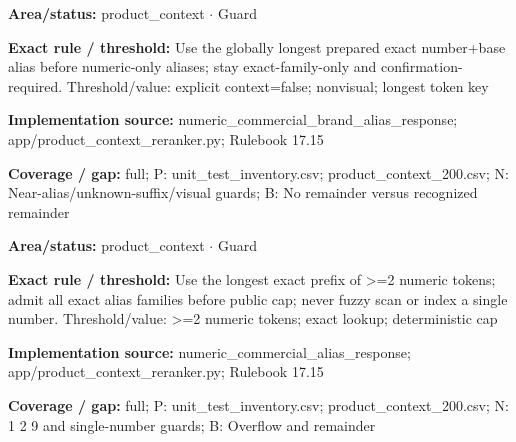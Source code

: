 \begin{tcolorbox}[enhanced,breakable,colback=white,colframe=Muted!45,boxrule=0.45pt,arc=1.5pt,left=6pt,right=6pt,top=5pt,bottom=5pt,title={\texttt{PC-NUMERIC-BRAND-ALIAS-21}},title after break={\texttt{PC-NUMERIC-BRAND-ALIAS-21}\ (continued)},fonttitle=\headingfont\bfseries\color{Navy},coltitle=Navy]
\textbf{Area/status:} product\_\allowbreak{}context $\boldsymbol{\cdot}$ Guard\par
\smallskip
\textbf{Exact rule / threshold:} Use the globally longest prepared exact number+base alias before numeric-only aliases; stay exact-family-only and confirmation-required. Threshold/\allowbreak{}value: explicit context=false; nonvisual; longest token key\par
\smallskip
\textbf{Implementation source:} numeric\_\allowbreak{}commercial\_\allowbreak{}brand\_\allowbreak{}alias\_\allowbreak{}response; app/\allowbreak{}product\_\allowbreak{}context\_\allowbreak{}reranker.py; Rulebook 17.15\par
\smallskip
\textbf{Coverage / gap:} full; P: unit\_\allowbreak{}test\_\allowbreak{}inventory.csv; product\_\allowbreak{}context\_\allowbreak{}200.csv; N: Near-alias/\allowbreak{}unknown-suffix/\allowbreak{}visual guards; B: No remainder versus recognized remainder
\end{tcolorbox}
\begin{tcolorbox}[enhanced,breakable,colback=white,colframe=Muted!45,boxrule=0.45pt,arc=1.5pt,left=6pt,right=6pt,top=5pt,bottom=5pt,title={\texttt{PC-NUMERIC-ONLY-ALIAS-22}},title after break={\texttt{PC-NUMERIC-ONLY-ALIAS-22}\ (continued)},fonttitle=\headingfont\bfseries\color{Navy},coltitle=Navy]
\textbf{Area/status:} product\_\allowbreak{}context $\boldsymbol{\cdot}$ Guard\par
\smallskip
\textbf{Exact rule / threshold:} Use the longest exact prefix of >=2 numeric tokens; admit all exact alias families before public cap; never fuzzy scan or index a single number. Threshold/\allowbreak{}value: >=2 numeric tokens; exact lookup; deterministic cap\par
\smallskip
\textbf{Implementation source:} numeric\_\allowbreak{}commercial\_\allowbreak{}alias\_\allowbreak{}response; app/\allowbreak{}product\_\allowbreak{}context\_\allowbreak{}reranker.py; Rulebook 17.15\par
\smallskip
\textbf{Coverage / gap:} full; P: unit\_\allowbreak{}test\_\allowbreak{}inventory.csv; product\_\allowbreak{}context\_\allowbreak{}200.csv; N: 1 2 9 and single-number guards; B: Overflow and remainder
\end{tcolorbox}
